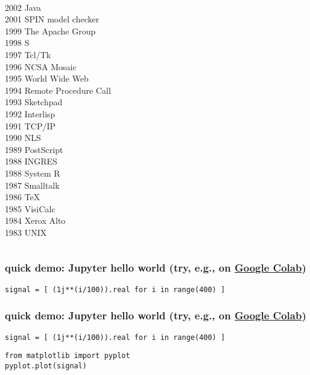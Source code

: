 \documentclass[aspectratio=169]{beamer}
\begin{document}
{\begin{columns}
\begin{column}{.33\textwidth}
\begin{block}{}
        ~\\
2002 	Java 	\\
2001 	SPIN model checker 	\\
1999 	The Apache Group 	\\
1998 	S 	\\
1997 	Tcl/Tk 	\\
1996 	NCSA Mosaic 	\\
1995 	World Wide Web 	\\
1994 	Remote Procedure Call 	\\
1993 	Sketchpad 	\\
1992 	Interlisp 	\\
1991 	TCP/IP 	\\
1990 	NLS 	\\
1989 	PostScript\\
1988 	INGRES 	\\
1988 	System R 	\\
1987 	Smalltalk 	\\
1986 	TeX 	\\
1985 	VisiCalc \\	
1984 	Xerox Alto \\	
1983 	UNIX
\end{block}
          
      \end{column}
  \end{columns}
}


\begin{frame}[fragile]
  \frametitle{quick demo: Jupyter hello world (try, e.g., on \href{https://colab.google/}{Google Colab})}
      \begin{lstlisting}
signal = [ (1j**(i/100)).real for i in range(400) ]
\end{lstlisting}
\end{frame}


\begin{frame}[fragile]
  \frametitle{quick demo: Jupyter hello world (try, e.g., on \href{https://colab.google/}{Google Colab})}
      \begin{lstlisting}
signal = [ (1j**(i/100)).real for i in range(400) ]
\end{lstlisting}
       \begin{lstlisting}
from matplotlib import pyplot
pyplot.plot(signal)
\end{lstlisting}
\end{frame}
\end{document}
